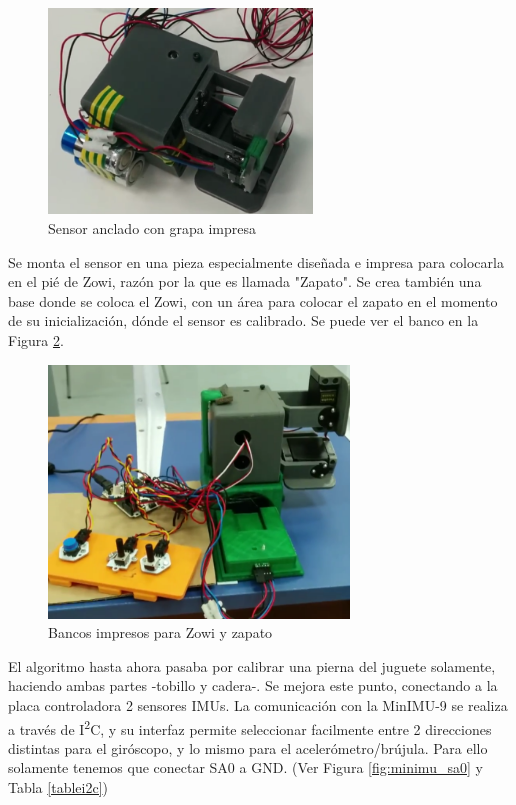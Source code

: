 \begin{figure}[h]
\centering
\includegraphics[width=70mm]{Figures/grapa}
\caption[Sensor anclado con grapa impresa]{Sensor anclado con grapa impresa}
\label{fig:grapa}
\end{figure}

Se monta el sensor en una pieza especialmente diseñada e impresa para colocarla en el pié de Zowi, razón por la que es llamada "Zapato".
Se crea también una base donde se coloca el Zowi, con un área para colocar el zapato en el momento de su inicialización, dónde el sensor es calibrado. Se puede ver el banco en la Figura \ref{fig:banco_1zapato}.


\begin{figure}[h]
\centering
\includegraphics[width=80mm]{Figures/banco_1zapato}
\caption[Bancos impresos para Zowi y zapato]{Bancos impresos para Zowi y zapato}
\label{fig:banco_1zapato}
\end{figure}

El algoritmo hasta ahora pasaba por calibrar una pierna del juguete solamente, haciendo ambas partes -tobillo y cadera-. Se mejora este punto, conectando a la placa controladora 2 sensores IMUs. La comunicación con la MinIMU-9 se realiza a través de I\textsuperscript{2}C, y su interfaz permite seleccionar facilmente entre 2 direcciones distintas para el giróscopo, y lo mismo para el acelerómetro/brújula. Para ello solamente tenemos que conectar SA0 a GND. (Ver Figura \ref{fig:minimu_sa0} y Tabla \ref{tablei2c})

